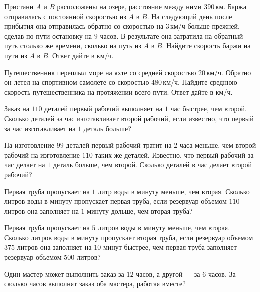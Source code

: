 \begin{consultation}
\begin{listofex}
		\item Пристани \( A \) и \( B \) расположены на озере, расстояние между ними \( 390 \) км. Баржа отправилась с постоянной скоростью из \( A \) в \( B \). На следующий день после прибытия она отправилась обратно со скоростью на \( 3 \) км/ч больше прежней, сделав по пути остановку на \( 9 \) часов. В результате она затратила на обратный путь столько же времени, сколько на путь из \( A \) в \( B \). Найдите скорость баржи на пути из \( A \) в \( B \). Ответ дайте в км/ч.
		\item Путешественник переплыл море на яхте со средней скоростью \( 20 \) км/ч. Обратно он летел на спортивном самолете со скоростью \( 480 \) км/ч. Найдите среднюю скорость путешественника на протяжении всего пути. Ответ дайте в км/ч.
		\item Заказ на \( 110 \) деталей первый рабочий выполняет на \( 1 \) час быстрее, чем второй. Сколько деталей за час изготавливает второй рабочий, если известно, что первый за час изготавливает на \( 1 \) деталь больше?
		\item На изготовление \( 99 \) деталей первый рабочий тратит на \( 2 \) часа меньше, чем второй рабочий на изготовление \( 110 \) таких же деталей. Известно, что первый рабочий за час делает на \( 1 \) деталь больше, чем второй. Сколько деталей в час делает второй рабочий?
		\item Первая труба пропускает на \( 1 \) литр воды в минуту меньше, чем вторая. Сколько литров воды в минуту пропускает первая труба, если резервуар объемом \( 110 \) литров она заполняет на \( 1 \) минуту дольше, чем вторая труба?
		\item Первая труба пропускает на \( 5 \) литров воды в минуту меньше, чем вторая. Сколько литров воды в минуту пропускает вторая труба, если резервуар объемом \( 375 \) литров она заполняет на \( 10 \) минут быстрее, чем первая труба заполняет резервуар объемом \( 500 \) литров?
		\item Один мастер может выполнить заказ за \( 12 \) часов, а другой --- за \( 6 \) часов. За сколько часов выполнят заказ оба мастера, работая вместе?
	\end{listofex}
\end{consultation}
